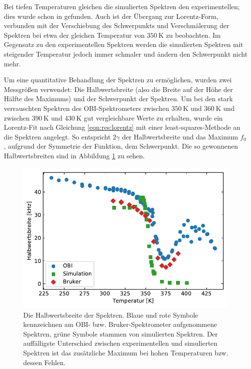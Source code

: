 Bei tiefen Temperaturen gleichen die simulierten Spektren den experimentellen; dies wurde schon in \cite{joachim_master} gefunden. Auch ist der Übergang zur Lorentz-Form, verbunden mit der Verschiebung des Schwerpunkts und Verschmälerung der Spektren bei etwa der gleichen Temperatur von $\SI{350}{\kelvin}$ zu beobachten. Im Gegensatz zu den experimentellen Spektren werden die simulierten Spektren mit steigender Temperatur jedoch immer schmaler und ändern den Schwerpunkt nicht mehr.


Um eine quantitative Behandlung der Spektren zu ermöglichen, wurden zwei Messgrößen verwendet: Die Halbwertsbreite (also die Breite auf der Höhe der Hälfte des Maximums) und der Schwerpunkt der Spektren. Um bei den stark verrauschten Spektren des OBI-Spektrometers zwischen $\SI{350}{\kelvin}$ und $\SI{360}{\kelvin}$ und zwischen $\SI{390}{\kelvin}$ und $\SI{430}{\kelvin}$ gut vergleichbare Werte zu erhalten, wurde ein Lorentz-Fit nach Gleichung \eqref{eqn:res:lorentz} mit einer least-squares-Methode an die Spektren angelegt. So entspricht $2 \gamma$ der Halbwertsbreite und das Maximum $f_0$, aufgrund der Symmetrie der Funktion, dem Schwerpunkt. Die so gewonnenen Halbwertsbreiten sind in Abbildung \ref{fig:res:spek_fwhm} zu sehen.
\begin{figure}
	\begin{center}
		\includegraphics[width=.9\textwidth]{graphics/plot/fwhm.pdf}
	\end{center}
	\caption{Die Halbwertsbreite der Spektren. Blaue und rote Symbole kennzeichnen am OBI- bzw. Bruker-Spektrometer aufgenommene Spektren, grüne Symbole stammen von simulierten Spektren. Der auffälligste Unterschied zwischen experimentellen und simulierten Spektren ist das zusätzliche Maximum bei hohen Temperaturen bzw. dessen Fehlen.} \label{fig:res:spek_fwhm}
\end{figure}

